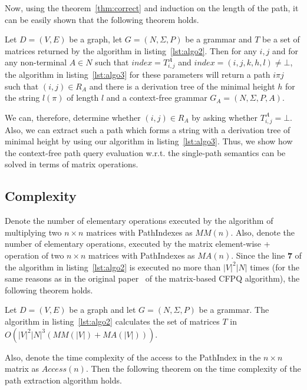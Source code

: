 Now, using the theorem~\ref{thm:correct} and induction on the length of the path, it can be easily shown that the following theorem holds.

\begin{mytheorem}\label{thm:correct_extraction}
	Let $D = (V,E)$ be a graph, let $G =(N,\Sigma,P)$ be a grammar and $T$ be a set of matrices returned by the algorithm in listing~\ref{lst:algo2}. Then for any $i, j$ and for any non-terminal $A \in N$ such that $index = T^A_{i,j}$ and $index = (i,j,k,h,l) \neq \bot$, the algorithm in listing~\ref{lst:algo3} for these parameters will return a path $i \pi j$ such that $(i,j) \in R_A$ and there is a derivation tree of the minimal height $h$ for the string $l(\pi)$ of length $l$ and a context-free grammar $G_A = (N,\Sigma,P,A)$.
\end{mytheorem}

We can, therefore, determine whether $(i,j) \in R_A$ by asking whether $T^A_{i,j} = \bot$. Also, we can extract such a path which forms a string with a derivation tree of minimal height by using our algorithm in listing~\ref{lst:algo3}. Thus, we show how the context-free path query evaluation w.r.t. the single-path semantics can be solved in terms of matrix operations.

\subsection{Complexity}

Denote the number of elementary operations executed by the algorithm of multiplying two $n \times n$ matrices with PathIndexes as $MM(n)$. Also, denote the number of elementary operations, executed by the matrix element-wise + operation of two $n \times n$ matrices with PathIndexes as $MA(n)$. Since the line \textbf{7} of the algorithm in listing~\ref{lst:algo2} is executed no more than $|V|^2|N|$ times (for the same reasons as in the original paper~\cite{Azimov:2018:CPQ:3210259.3210264} of the matrix-based CFPQ algorithm), the following theorem holds.

\begin{myproposition}\label{thm:time}
	Let $D = (V,E)$ be a graph and let $G =(N,\Sigma,P)$ be a grammar. The algorithm in listing~\ref{lst:algo2} calculates the set of matrices $T$ in $O(|V|^2|N|^3(MM(|V|) + MA(|V|)))$.
\end{myproposition}

Also, denote the time complexity of the access to the PathIndex in the $n \times n$ matrix as $Access(n)$. Then the following theorem on the time complexity of the path extraction algorithm holds.

